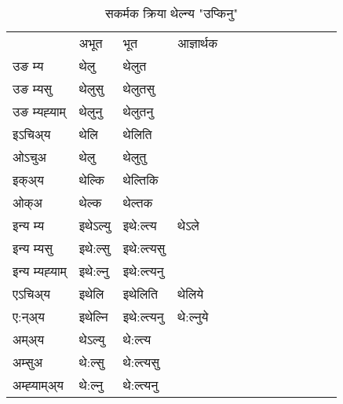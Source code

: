 \begin{table}[H]
\centering
\caption{\label{el.vt} सकर्मक क्रिया  थेल्न्य  "उप्किनु"  }
\begin{tabular}{l|l|l|l|l|l|l|l|l|l|l|l|l}  \toprule
&अभूत & भूत & आज्ञार्थक \\ 
उङ म्य &थेलु &थेलुत \\ 
उङ म्यसु &थेलुसु &थेलुतसु \\ 
उङ म्यह्‍याम् &थेलुनु &थेलुतनु \\ 
इऽचिअ्य  &थेलि &थेलिति   \\ 
ओऽचुअ &थेलु &थेलुतु   \\ 
इक्अ्य &थेल्कि &थेल्तिकि   \\ 
ओक्अ &थेल्क &थेल्तक   \\ 
इन्य म्य& इथेऽल्यु  & इथे:ल्त्य &थेऽले  \\ 
इन्य म्यसु & इथे:ल्सु  & इथे:ल्त्यसु   \\ 
इन्य म्यह्‍याम् & इथे:ल्नु  & इथे:ल्त्यनु   \\ 
एऽचिअ्य & इथेलि & इथेलिति &थेलिये    \\ 
ए:न्अ्य & इथेल्नि  & इथे:ल्त्यनु &थे:ल्नुये  \\ 
अम्अ्य & थेऽल्यु  & थे:ल्त्य  \\ 
अम्सुअ & थे:ल्सु & थे:ल्त्यसु  \\ 
अम्ह्‍याम्अ्य & थे:ल्नु  & थे:ल्त्यनु \\ 
\bottomrule
\end{tabular}
\end{table}


